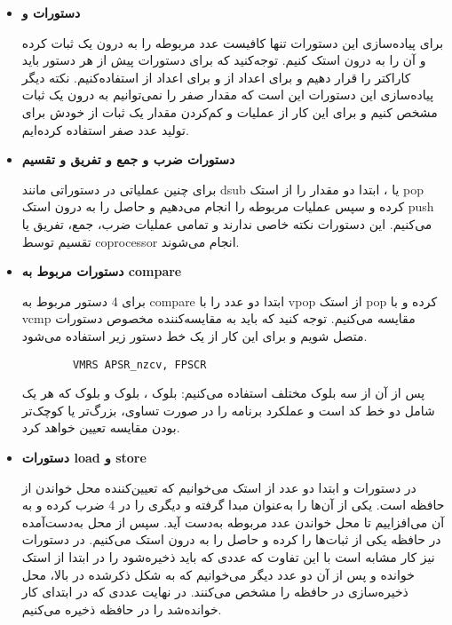 \begin{itemize}
	
	\item\textbf{
	 دستورات 
	 و
}

برای پیاده‌سازی این دستورات تنها کافیست عدد مربوطه را به درون یک ثبات
 کرده و آن را به درون استک 
 کنیم. توجه‌کنید که برای دستورات
   پیش از هر دستور باید کاراکتر 
 را قرار دهیم و برای اعداد
   از 
    و برای اعداد 
    از
    استفاده‌کنیم. نکته دیگر پیاده‌سازی این دستورات این است که مقدار صفر را نمی‌توانیم به درون یک ثبات مشخص
کنیم 
      و برای این کار از عملیات
       و کم‌کردن مقدار یک ثبات از خودش برای تولید عدد صفر استفاده کرده‌ایم.
	
	\item \textbf{
		دستورات ضرب و جمع و تفریق و تقسیم
	}
	
	برای چنین عملیاتی در دستوراتی مانند dsub یا 
	،
	ابتدا دو مقدار را از استک pop کرده و سپس عملیات مربوطه را انجام می‌دهیم و حاصل را به درون استک push می‌کنیم. این دستورات نکته خاصی ندارند و تمامی عملیات ضرب، جمع، تفریق یا تقسیم توسط coprocessor انجام می‌شوند.
	
	\item \textbf{
		دستورات مربوط به compare
	}
	
	برای 4 دستور مربوط به compare ابتدا دو عدد را با vpop از استک pop کرده و با vcmp مقایسه می‌کنیم. توجه کنید که باید به مقایسه‌کننده مخصوص دستورات
	متصل شویم و برای این کار از یک خط دستور زیر استفاده می‌شود.
	\begin{latin}
		\begin{verbatim}
		VMRS APSR_nzcv, FPSCR 
		\end{verbatim}
	\end{latin}
	
	پس از آن از سه بلوک مختلف استفاده می‌کنیم: بلوک
،
 بلوک
  و بلوک
 که هر یک شامل دو خط کد است و عملکرد برنامه را در صورت تساوی، بزرگ‌تر یا کوچک‌تر بودن مقایسه تعیین خواهد کرد.
	\item \textbf{
		دستورات load و store
	}
	
	در دستورات 
 و 
  ابتدا دو عدد از استک می‌خوانیم که تعیین‌کننده محل خواندن از حافظه است. یکی از آن‌ها را به‌عنوان مبدا گرفته و دیگری را در 4 ضرب کرده و به آن می‌افزاییم تا محل خواندن عدد مربوطه به‌دست آید. سپس از محل به‌دست‌آمده در حافظه یکی از ثبات‌ها را
 کرده
  و حاصل را به درون استک 
می‌کنیم.
در دستورات
 نیز کار مشابه است با این تفاوت که عددی که باید ذخیره‌شود را در ابتدا از استک خوانده و پس از آن دو عدد دیگر می‌خوانیم که به شکل ذکرشده در بالا، محل ذخیره‌سازی در حافظه را مشخص می‌کنند. در نهایت عددی که در ابتدای کار خوانده‌شد را در حافظه ذخیره می‌کنیم.
	

\end{itemize}
